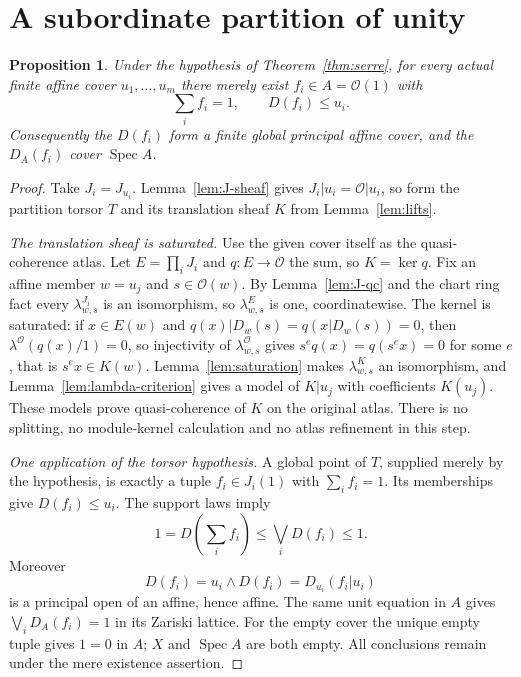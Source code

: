 \documentclass[11pt]{amsart}
\newtheorem{proposition}[theorem]{Proposition}
\theoremstyle{definition}\newtheorem{definition}[theorem]{Definition}
\theoremstyle{remark}\newtheorem{remark}[theorem]{Remark}
\newcommand{\OO}{\mathcal O}
\newcommand{\Spec}{\operatorname{Spec}}
\begin{document}
\section{A subordinate partition of unity}\label{sec:partition}
\begin{proposition}\label{prop:principalcover}
Under the hypothesis of Theorem~\ref{thm:serre}, for every actual
finite affine cover $u_1,\ldots,u_m$ there merely exist
$f_i\in A=\OO(1)$ with
\begin{equation}\label{eq:global-unit}
 \sum_i f_i=1,\qquad D(f_i)\le u_i.
\end{equation}
Consequently the $D(f_i)$ form a finite global principal affine cover,
and the $D_A(f_i)$ cover $\Spec A$.
\end{proposition}
\begin{proof}
Take $J_i=J_{u_i}$. Lemma~\ref{lem:J-sheaf} gives
$J_i|u_i=\OO|u_i$, so form the partition torsor $T$ and its
translation sheaf $K$ from Lemma~\ref{lem:lifts}.

\emph{The translation sheaf is saturated.}
Use the given cover itself as the quasi-coherence atlas. Let
$E=\prod_iJ_i$ and $q:E\to\OO$ the sum, so $K=\ker q$. Fix an affine
member $w=u_j$ and $s\in\OO(w)$. By Lemma~\ref{lem:J-qc} and the chart
ring fact every $\lambda^{J_i}_{w,s}$ is an isomorphism, so
$\lambda^E_{w,s}$ is one, coordinatewise. The kernel is saturated: if
$x\in E(w)$ and $q(x)|D_w(s)=q(x|D_w(s))=0$, then
$\lambda^{\OO}(q(x)/1)=0$, so injectivity of $\lambda^{\OO}_{w,s}$ gives
$s^eq(x)=q(s^ex)=0$ for some $e$, that is $s^ex\in K(w)$.
Lemma~\ref{lem:saturation} makes $\lambda^K_{w,s}$ an isomorphism, and
Lemma~\ref{lem:lambda-criterion} gives a model of $K|u_j$ with
coefficients $K(u_j)$. These models prove quasi-coherence of $K$ on the
original atlas. There is no splitting, no module-kernel calculation and
no atlas refinement in this step.

\emph{One application of the torsor hypothesis.}
A global point of $T$, supplied merely by the hypothesis, is exactly
a tuple $f_i\in J_i(1)$ with $\sum_i f_i=1$. Its memberships give
$D(f_i)\le u_i$. The support laws imply
\[
 1=D(\sum_i f_i)\le\bigvee_iD(f_i)\le1.
\]
Moreover
\[
 D(f_i)=u_i\wedge D(f_i)=D_{u_i}(f_i|u_i)
\]
is a principal open of an affine, hence affine. The same unit equation
in $A$ gives $\bigvee_iD_A(f_i)=1$ in its Zariski lattice.
For the empty cover the unique empty tuple gives $1=0$ in $A$;
$X$ and $\Spec A$ are both empty. All conclusions remain under the
mere existence assertion.
\end{proof}
\end{document}
